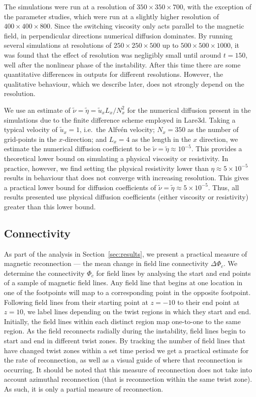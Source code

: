 The simulations were run at a resolution of $350 \times 350 \times 700$, with the exception of the parameter studies, which were run at a slightly higher resolution of $400 \times 400 \times 800$. Since the switching viscosity only acts parallel to the magnetic field, in perpendicular directions numerical diffusion dominates. By running several simulations at resolutions of $250 \times 250 \times 500$ up to $500 \times 500 \times 1000$, it was found that the effect of resolution was negligibly small until around $t=150$, well after the nonlinear phase of the instability. After this time there are some quantitative differences in outputs for different resolutions. However, the qualitative behaviour, which we describe later, does not strongly depend on the resolution.

We use an estimate of $\tilde{\nu} = \tilde{\eta} = \tilde{u}_x L_x/N_x^2$ for the numerical diffusion present in the simulations due to the finite difference scheme employed in Lare3d. Taking a typical velocity of $\tilde{u}_x = 1$, i.e.\ the Alfv\'en velocity; $N_x = 350$ as the number of grid-points in the $x$-direction; and $L_x = 4$ as the length in the $x$ direction, we estimate the numerical diffusion coefficient to be $\tilde{\nu} = \tilde{\eta} \approx 10^{-5}$. This provides a theoretical lower bound on simulating a physical viscosity or resistivity. In practice, however, we find setting the physical resistivity lower than $\eta \approx 5\times10^{-5}$ results in behaviour that does not converge with increasing resolution. This gives a practical lower bound for diffusion coefficients of $\tilde{\nu} = \tilde{\eta} \approx 5 \times 10^{-5}$. Thus, all results presented use physical diffusion coefficients (either viscosity or resistivity) greater than this lower bound.

\subsection{Connectivity}

As part of the analysis in Section~\ref{sec:results}, we present a
practical measure of magnetic reconnection --- the mean change in
field line connectivity $\Delta\Phi_c$. We determine the connectivity
$\Phi_c$ for field lines by analysing the start and end points of a
sample of magnetic field lines. Any field line that begins at one
location in one of the footpoints will map to a corresponding point in
the opposite footpoint. Following field lines from their starting
point at $z=-10$ to their end point at $z=10$, we label lines
depending on the twist regions in which they start and end. Initially,
the field lines within each distinct region map one-to-one to the same
region. As the field reconnects radially during the instability, field lines
begin to start and end in different twist zones. By tracking the
number of field lines that have changed twist zones within a set
time period we get a practical estimate for the rate of
reconnection, as well as a visual guide of where that reconnection is
occurring. It should be noted that this measure of reconnection does not take into account azimuthal reconnection (that is reconnection within the same twist zone). As such, it is only a partial measure of reconnection.

